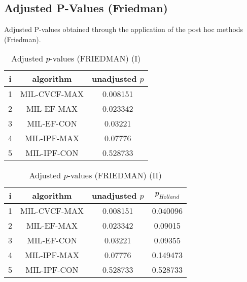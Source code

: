 \documentclass[a4paper,10pt]{article}
\begin{document}
\begin{landscape}
\newpage

\section{Adjusted P-Values (Friedman)}


Adjusted P-values obtained through the application of the post hoc methods (Friedman).

\begin{table}[!htp]
\centering\small
\begin{tabular}{ccc}
i&algorithm&unadjusted $p$\\
\hline1&MIL-CVCF-MAX&0.008151\\2&MIL-EF-MAX&0.023342\\3&MIL-EF-CON&0.03221\\4&MIL-IPF-MAX&0.07776\\5&MIL-IPF-CON&0.528733\\\hline
\end{tabular}
\caption{Adjusted $p$-values (FRIEDMAN) (I)}
\end{table}
\begin{table}[!htp]
\centering\small
\begin{tabular}{cccc}
i&algorithm&unadjusted $p$&$p_{Holland}$\\
\hline1&MIL-CVCF-MAX&0.008151&0.040096\\2&MIL-EF-MAX&0.023342&0.09015\\3&MIL-EF-CON&0.03221&0.09355\\4&MIL-IPF-MAX&0.07776&0.149473\\5&MIL-IPF-CON&0.528733&0.528733\\\hline
\end{tabular}
\caption{Adjusted $p$-values (FRIEDMAN) (II)}
\end{table}

\newpage
\end{landscape}
\end{document}
